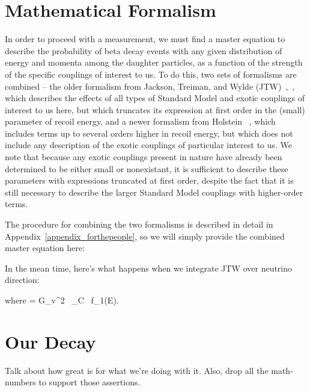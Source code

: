 \section{Mathematical Formalism}
	In order to proceed with a measurement, we must find a master equation to describe the probability of beta decay events with any given distribution of energy and momenta among the daughter particles, as a function of the strength of the specific couplings of interest to us.  To do this, two sets of formalisms are combined -- the older formalism from Jackson, Treiman, and Wylde (JTW)~\cite{jtw},~\cite{jtw_coulomb}, which describes the effects of all types of Standard Model and exotic couplings of interest to us here, but which truncates its expression at first order in the (small) parameter of recoil energy, and a newer formalism from Holstein ~\cite{holstein}, which includes terms up to several orders higher in recoil energy, but which does not include any description of the exotic couplings of particular interest to us.  We note that because any exotic couplings present in nature have already been determined to be either small or nonexistant, it is sufficient to describe these parameters with expressions truncated at first order, despite the fact that it is still necessary to describe the larger Standard Model couplings with higher-order terms. 
	
	The procedure for combining the two formalisms is described in detail in Appendix~\ref{appendix_forthepeople}, so we will simply provide the combined master equation here:



In the mean time, here's what happens when we integrate JTW over neutrino direction:

where 
\bea
\xi = G_v^2 \, \cos\theta_C \, f_1(E).
\eea



\section{Our Decay}
Talk about how great  is for what we're doing with it.  Also, drop all the math-numbers to support those assertions.


